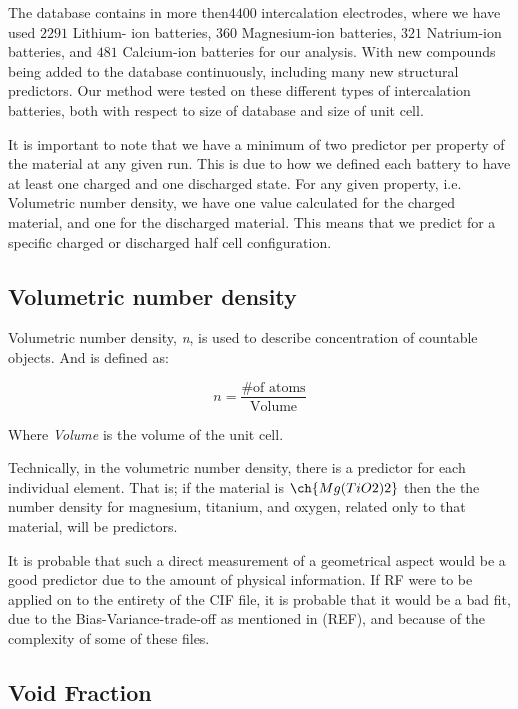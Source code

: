 The database contains in more then$4400$ intercalation electrodes, where we have used $2291$ Lithium- ion batteries,  $360$ Magnesium-ion batteries, $321$ Natrium-ion batteries, and $481$ Calcium-ion batteries for our analysis. With new compounds being added to the database continuously, including many new structural predictors. Our method were tested on these different types of intercalation batteries, both with respect to size of database and size of unit cell.

	It is important to note that we have a minimum of two predictor per property of the material at any given run. This is due to how we defined each battery to have at least one charged and one discharged state. For any given property, i.e. Volumetric number density, we have one value calculated for the charged material, and one for the discharged material. This means that we predict for a specific charged or discharged half cell configuration.

\subsection{Volumetric number density }

	Volumetric number density, \textit{n}, is used to describe concentration of countable objects. And is defined as: 
	
\begin{equation}\label{eq:n}
n= \frac{\#\text{of atoms}}{\text{Volume}}
\end{equation}

	Where \textit{Volume} is the volume of the unit cell. 
	
	Technically, in the volumetric number density, there is a predictor for each individual element. That is; if the material is $\ch{Mg(TiO2)2}$ then the the number density for magnesium, titanium, and oxygen, related only to that material, will be predictors.

It is probable that such a direct measurement of a geometrical aspect would be a good predictor due to the amount of physical information. If RF were to be applied on to the entirety of the CIF file, it is probable that it would be a bad fit, due to the Bias-Variance-trade-off as mentioned in (REF), and because of the complexity of some of these files. 

\subsection{Void Fraction} 

